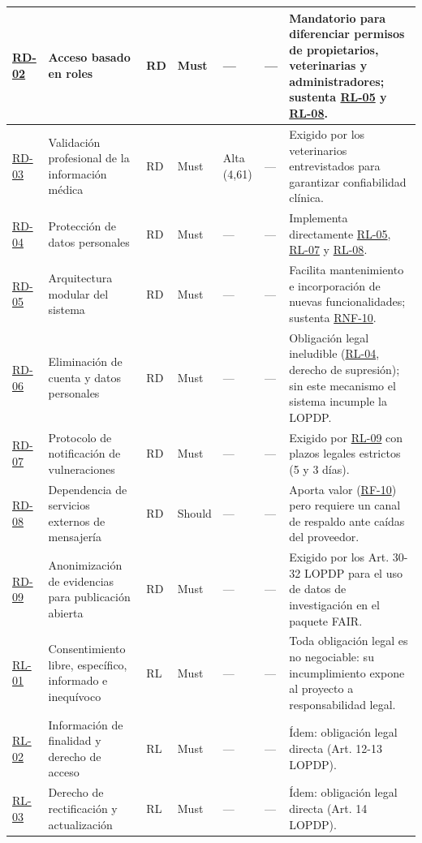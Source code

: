\documentclass[journal,onecolumn]{IEEEtran}
\begin{document}
\begin{landscape}
\begin{longtable}{@{}p{1.2cm} p{5.2cm} p{1.0cm} p{1.3cm} p{1.3cm} p{1.1cm} p{6.5cm}@{}}
			\hyperref[tab:RD-02]{RD-02} & Acceso basado en roles & RD & Must & --- & --- & Mandatorio para diferenciar permisos de propietarios, veterinarias y administradores; sustenta \hyperref[rl:05]{RL-05} y \hyperref[rl:08]{RL-08}. \\ \midrule
			\hyperref[tab:RD-03]{RD-03} & Validación profesional de la información médica & RD & Must & Alta (4,61) & --- & Exigido por los veterinarios entrevistados para garantizar confiabilidad clínica. \\ \midrule
			\hyperref[tab:RD-04]{RD-04} & Protección de datos personales & RD & Must & --- & --- & Implementa directamente \hyperref[rl:05]{RL-05}, \hyperref[rl:07]{RL-07} y \hyperref[rl:08]{RL-08}. \\ \midrule
			\hyperref[tab:RD-05]{RD-05} & Arquitectura modular del sistema & RD & Must & --- & --- & Facilita mantenimiento e incorporación de nuevas funcionalidades; sustenta \hyperref[tab:RNF-10]{RNF-10}. \\ \midrule
			\hyperref[tab:RD-06]{RD-06} & Eliminación de cuenta y datos personales & RD & Must & --- & --- & Obligación legal ineludible (\hyperref[rl:04]{RL-04}, derecho de supresión); sin este mecanismo el sistema incumple la LOPDP. \\ \midrule
			\hyperref[tab:RD-07]{RD-07} & Protocolo de notificación de vulneraciones & RD & Must & --- & --- & Exigido por \hyperref[rl:09]{RL-09} con plazos legales estrictos (5 y 3 días). \\ \midrule
			\hyperref[tab:RD-08]{RD-08} & Dependencia de servicios externos de mensajería & RD & Should & --- & --- & Aporta valor (\hyperref[tab:RF-10]{RF-10}) pero requiere un canal de respaldo ante caídas del proveedor. \\ \midrule
			\hyperref[tab:RD-09]{RD-09} & Anonimización de evidencias para publicación abierta & RD & Must & --- & --- & Exigido por los Art. 30-32 LOPDP para el uso de datos de investigación en el paquete FAIR. \\ \midrule
			\hyperref[rl:01]{RL-01} & Consentimiento libre, específico, informado e inequívoco & RL & Must & --- & --- & Toda obligación legal es no negociable: su incumplimiento expone al proyecto a responsabilidad legal. \\ \midrule
			\hyperref[rl:02]{RL-02} & Información de finalidad y derecho de acceso & RL & Must & --- & --- & Ídem: obligación legal directa (Art. 12-13 LOPDP). \\ \midrule
			\hyperref[rl:03]{RL-03} & Derecho de rectificación y actualización & RL & Must & --- & --- & Ídem: obligación legal directa (Art. 14 LOPDP). \\ \midrule

\end{longtable}
\end{landscape}
\end{document}
